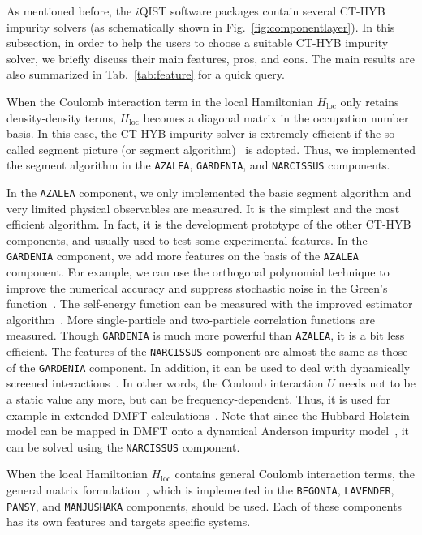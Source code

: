 As mentioned before, the $i$QIST software packages contain several CT-HYB impurity solvers (as schematically shown in Fig.~\ref{fig:componentlayer}). In this subsection, in order to help the users to choose a suitable CT-HYB impurity solver, we briefly discuss their main features, pros, and cons. The main results are also summarized in Tab.~\ref{tab:feature} for a quick query.

When the Coulomb interaction term in the local Hamiltonian $H_{\text{loc}}$ only retains density-density terms, $H_{\text{loc}}$ becomes a diagonal matrix in the occupation number basis. In this case, the CT-HYB impurity solver is extremely efficient if the so-called segment picture (or segment algorithm)~\cite{PhysRevLett.97.076405,RevModPhys.83.349} is adopted. Thus, we implemented the segment algorithm in the \texttt{AZALEA}, \texttt{GARDENIA}, and \texttt{NARCISSUS} components.

In the \texttt{AZALEA} component, we only implemented the basic segment algorithm and very limited physical observables are measured. It is the simplest and the most efficient algorithm. In fact, it is the development prototype of the other CT-HYB components, and usually used to test some experimental features. In the \texttt{GARDENIA} component, we add more features on the basis of the \texttt{AZALEA} component. For example, we can use the orthogonal polynomial technique to improve the numerical accuracy and suppress stochastic noise in the Green's function~\cite{PhysRevB.84.075145}. The self-energy function can be measured with the improved estimator algorithm~\cite{PhysRevB.89.235128,PhysRevB.85.205106}. More single-particle and two-particle correlation functions are measured. Though \texttt{GARDENIA} is much more powerful than \texttt{AZALEA}, it is a bit less efficient. The features of the \texttt{NARCISSUS} component are almost the same as those of the \texttt{GARDENIA} component. In addition, it can be used to deal with dynamically screened interactions~\cite{PhysRevLett.104.146401,Werner2012}. In other words, the Coulomb interaction $U$ needs not to be a static value any more, but can be frequency-dependent. Thus, it is used for example in extended-DMFT calculations~\cite{PhysRevB.87.125149}. Note that since the Hubbard-Holstein model can be mapped in DMFT onto a dynamical Anderson impurity model~\cite{PhysRevLett.99.146404}, it can be solved using the \texttt{NARCISSUS} component.

When the local Hamiltonian $H_{\text{loc}}$ contains general Coulomb interaction terms, the general matrix formulation~\cite{PhysRevB.74.155107,PhysRevB.75.155113}, which is implemented in the \texttt{BEGONIA}, \texttt{LAVENDER}, \texttt{PANSY}, and \texttt{MANJUSHAKA} components, should be used. Each of these components has its own features and targets specific systems.

